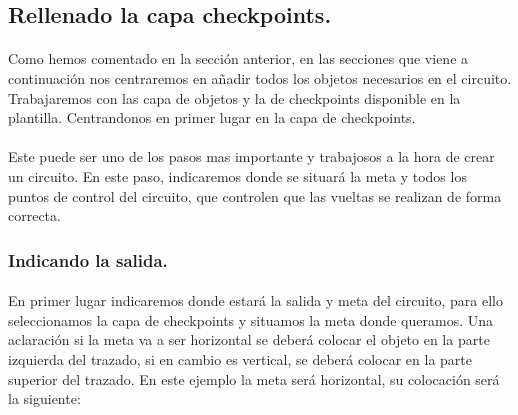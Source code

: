 \subsection{Rellenado la capa checkpoints.}

\paragraph{}
Como hemos comentado en la sección anterior, en las secciones que viene a continuación nos centraremos en añadir todos los 
objetos necesarios en el circuito. Trabajaremos con las capa de objetos y la de checkpoints disponible en la plantilla. 
Centrandonos en primer lugar en la capa de checkpoints.

\paragraph{}
Este puede ser uno de los pasos mas importante y trabajosos a la hora de crear un circuito. En este paso, indicaremos donde se 
situará la meta y todos los puntos de control del circuito, que controlen que las vueltas se realizan de forma correcta.

\subsubsection{Indicando la salida.}

\paragraph{}
En primer lugar indicaremos donde estará la salida y meta del circuito, para ello seleccionamos la capa de checkpoints y 
situamos la meta donde queramos. Una aclaración si la meta va a ser horizontal se deberá colocar el objeto en la parte izquierda
del trazado, si en cambio es vertical, se deberá colocar en la parte superior del trazado. En este ejemplo la meta será horizontal,
su colocación será la siguiente:

